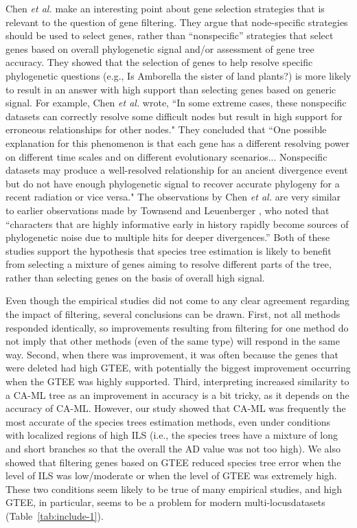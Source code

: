 Chen {\em et al.} \cite{chen2015selecting} make an interesting point about gene selection strategies that is relevant to the question of gene filtering. 
They argue that node-specific strategies \cite{salichos2013inferring} should be used to select genes, rather than ``nonspecific'' strategies that select genes based on overall phylogenetic signal and/or assessment of gene tree accuracy. They showed that the selection of genes  to help resolve specific phylogenetic questions (e.g., Is Amborella the sister of land plants?) is more likely to result in an answer with high support than selecting genes based on generic signal. 
For example, Chen {\em et al.} \cite{chen2015selecting} wrote, ``In some extreme cases, these nonspecific datasets can correctly resolve some difficult nodes but result in high support for erroneous relationships for other nodes." They concluded that ``One possible explanation for this phenomenon is that each gene has a different resolving power on different time scales and on different evolutionary scenarios... Nonspecific datasets may produce a well-resolved relationship for an ancient divergence event but do not have enough phylogenetic signal to recover accurate phylogeny for a recent radiation or vice versa." 
The observations by Chen {\em et al.} \cite{chen2015selecting} are very similar to earlier observations made by Townsend and Leuenberger \cite{townsend2011taxon}, who noted that ``characters that are highly informative early in history rapidly become sources of phylogenetic noise due to multiple hits for deeper divergences.'' 
Both of these studies support the hypothesis that species tree estimation is likely to benefit from selecting a mixture of genes aiming to resolve different parts of the tree, rather than selecting genes on the basis of overall high signal.

Even though the empirical studies did not come to any clear agreement regarding the impact of filtering, several conclusions can be drawn. First, not all methods responded identically, so improvements resulting from filtering for one method do not imply that other methods (even of the same type) will respond in the same way. Second, when there was improvement, it was often because the genes that were deleted had high GTEE, with potentially the biggest improvement occurring when the GTEE was highly supported. Third, interpreting increased similarity to a CA-ML tree as an improvement in accuracy is a bit tricky, as it depends on the accuracy of CA-ML. However, our study showed that CA-ML was frequently the most accurate of the species trees estimation methods, even under conditions with localized regions of high ILS (i.e., the species trees have a mixture of long and short branches so that the overall the AD value was not too high). We also showed that filtering genes based on GTEE reduced species tree error when the level of ILS was low/moderate or when the level of GTEE was extremely high. These two conditions seem likely to be true of many empirical studies, and high GTEE, in particular, seems to be a problem for modern \glspl{multi-locusdataset} (Table~\ref{tab:include-1}).

